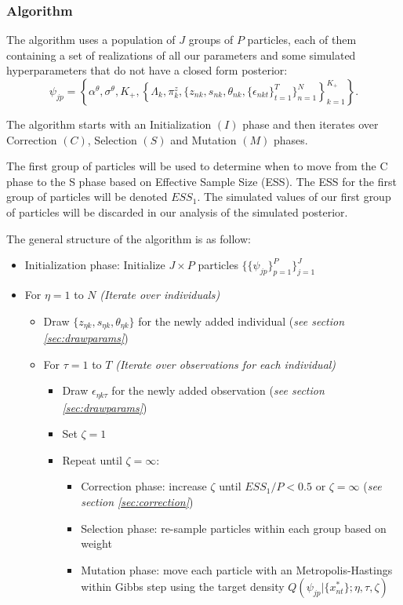 \documentclass[12pt]{article}
\newcounter{thm}[section]
\begin{document}
\subsubsection{Algorithm}

The algorithm uses a population of $J$ groups of $P$ particles, each of them containing a set of realizations of all our parameters and some simulated hyperparameters that do not have a closed form posterior: $$\psi_{jp} = \left\{\alpha^\theta, \sigma^\theta, K_+,\left\{\Lambda_k, \pi^z_k, \{z_{nk},s_{nk},\theta_{nk},\{\epsilon_{nkt}\}_{t=1}^T \}_{n=1}^N \right\}_{k=1}^{K_+} \right\}.$$

The algorithm starts with an Initialization $(I)$ phase and then iterates over Correction $(C)$, Selection $(S)$ and Mutation $(M)$ phases. 

The first group of particles will be used to determine when to move from the C phase to the S phase based on Effective Sample Size (ESS). The ESS for the first group of particles will be denoted $ESS_1$. The simulated values of our first group of particles will be discarded in our analysis of the simulated posterior.  

The general structure of the algorithm is as follow:


\begin{itemize}
	\item Initialization phase: Initialize $J \times P$ particles $\{\{\psi_{jp}\}_{p=1}^P\}_{j=1}^J$
	\item For $\eta=1$ to $N$ {\it (Iterate over individuals)}
	\begin{itemize}
		\item Draw $\{z_{\eta k},s_{\eta k},\theta_{\eta k}\}$ for the newly added individual (\textit{see section \ref{sec:drawparams}})
		\item For $\tau=1$ to $T$ {\it (Iterate over observations for each individual)}
		\begin{itemize}
			\item Draw $\epsilon_{\eta k \tau}$ for the newly added observation (\textit{see section \ref{sec:drawparams}})
			\item Set $\zeta = 1$
			\item Repeat until $\zeta = \infty$:
			\begin{itemize}
				\item Correction phase: increase $\zeta$ until $ESS_1/P<0.5$ or $\zeta=\infty$ (\textit{see section \ref{sec:correction}})
				\item Selection phase: re-sample particles within each group based on weight
				\item Mutation phase: move each particle with an Metropolis-Hastings within Gibbs step using the target density $ Q(\psi_{jp}|\{x_{nt}^*\};\eta,\tau,\zeta) $
			\end{itemize}
		\end{itemize}
	\end{itemize}
\end{itemize}
\end{document}
